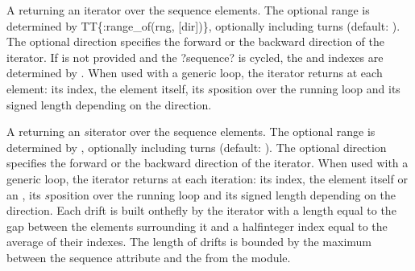 \documentclass[letterpaper,10pt,english]{sphinxmanual}
\begin{document}
\begin{description}
\sphinxAtStartPar
A  \sphinxcode{\sphinxupquote{({[}rng{]}, {[}ntrn{]}, {[}dir{]})}} returning an iterator over the sequence elements. The optional range is determined by
TT\{:range\_of(rng, {[}dir{]})\}, optionally including  turns (default: ). The optional direction  specifies the forward 
or the backward  direction of the iterator. If  is not provided and the ?sequence? is cycled, the  and  indexes are
determined by . When used with a generic  loop, the iterator returns at each element: its index,
the element itself, its \(s\)\sphinxhyphen{}position over the running loop and its signed length depending on the direction.

\sphinxAtStartPar
A  \sphinxcode{\sphinxupquote{({[}rng{]}, {[}ntrn{]}, {[}dir{]})}} returning an \(s\)\sphinxhyphen{}iterator over the sequence elements. The optional range is determined by
, optionally including  turns (default: ). The optional direction  specifies the
forward  or the backward  direction of the iterator. When used with a generic  loop, the iterator returns at each
iteration: its index, the element itself or an  , its \(s\)\sphinxhyphen{}position over the running loop and its signed length
depending on the direction. Each  drift is built on\sphinxhyphen{}the\sphinxhyphen{}fly by the iterator with a length equal to the gap between the elements
surrounding it and a half\sphinxhyphen{}integer index equal to the average of their indexes. The length of  drifts is bounded by the maximum
between the sequence attribute  and the  from the {\hyperref[\detokenize{constants::doc}]{}} module.


\end{description}
\end{document}
